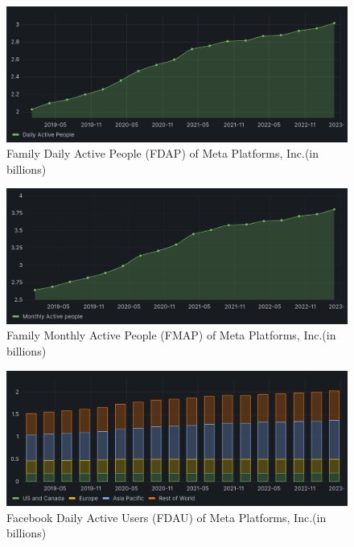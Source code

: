 \documentclass[12pt, a4paper]{article}
\begin{document}
\begin{figure}[h]
    \centering
    \includegraphics[width=1.00\textwidth]{family-dap}
    \caption{Family Daily Active People (FDAP) of Meta Platforms, Inc.(in
    billions)\cite{2023q1,2021q2Slides,2019q4Slides}}
    \label{fig:family-dap}
\end{figure}

\begin{figure}[h]
    \centering
    \includegraphics[width=1.00\textwidth]{family-map}
    \caption{Family Monthly Active People (FMAP) of Meta Platforms, Inc.(in
    billions)\cite{2023q1,2021q2Slides,2019q4Slides}}
    \label{fig:family-map}
\end{figure}

\begin{figure}[h]
    \centering
    \includegraphics[width=1.00\textwidth]{facebook-dau}
    \caption{Facebook Daily Active Users (FDAU) of Meta Platforms, Inc.(in
    billions)\cite{2023q1,2021q2Slides,2019q4Slides}}
    \label{fig:facebook-dau}
\end{figure}
\end{document}
